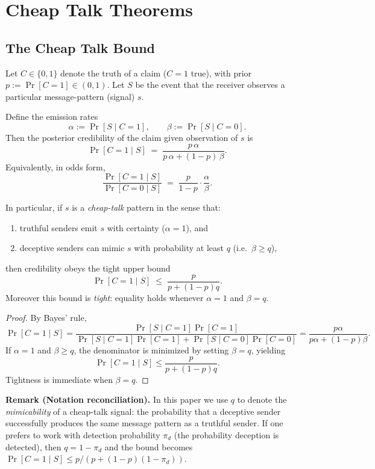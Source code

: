 \section{Cheap Talk Theorems}\label{cheap-talk-theorems}

\subsection{The Cheap Talk Bound}\label{the-cheap-talk-bound}

\begin{theorem}\label{thm:cheap-talk-bound}
Let $C\in\{0,1\}$ denote the truth of a claim ($C=1$ true), with prior
$p := \Pr[C=1]\in(0,1)$. Let $S$ be the event that the receiver observes a
particular message-pattern (signal) $s$.

 

Define the emission rates
\[
\alpha := \Pr[S \mid C=1],\qquad \beta := \Pr[S \mid C=0].
\]
Then the posterior credibility of the claim given observation of $s$ is
\[
\Pr[C=1 \mid S] \;=\; \frac{p\,\alpha}{p\,\alpha + (1-p)\,\beta}.
\]
Equivalently, in odds form,
\[
\frac{\Pr[C=1 \mid S]}{\Pr[C=0 \mid S]}
\;=\;
\frac{p}{1-p}\cdot \frac{\alpha}{\beta}.
\]

In particular, if $s$ is a \emph{cheap-talk} pattern in the sense that:
\begin{enumerate}
\item[(i)] truthful senders emit $s$ with certainty ($\alpha=1$), and
\item[(ii)] deceptive senders can mimic $s$ with probability at least $q$
(i.e.\ $\beta \ge q$),
\end{enumerate}
then credibility obeys the tight upper bound
\[
\Pr[C=1 \mid S] \;\le\; \frac{p}{p+(1-p)q}.
\]
Moreover this bound is \emph{tight}: equality holds whenever $\alpha=1$ and $\beta=q$.
\end{theorem}

\begin{proof}
By Bayes' rule,
\[
\Pr[C=1 \mid S]
= \frac{\Pr[S\mid C=1]\Pr[C=1]}{\Pr[S\mid C=1]\Pr[C=1] + \Pr[S\mid C=0]\Pr[C=0]}
= \frac{p\alpha}{p\alpha+(1-p)\beta}.
\]
If $\alpha=1$ and $\beta \ge q$, the denominator is minimized by setting $\beta=q$,
yielding
\[
\Pr[C=1 \mid S]\le \frac{p}{p+(1-p)q}.
\]
Tightness is immediate when $\beta=q$.
\end{proof}

\textbf{Remark (Notation reconciliation).} In this paper we use $q$ to denote the
\emph{mimicability} of a cheap-talk signal: the probability that a deceptive sender
successfully produces the same message pattern as a truthful sender. If one prefers
to work with detection probability $\pi_d$ (the probability deception is detected),
then $q = 1 - \pi_d$ and the bound becomes
$\Pr[C=1 \mid S] \le p / (p + (1-p)(1-\pi_d))$.

